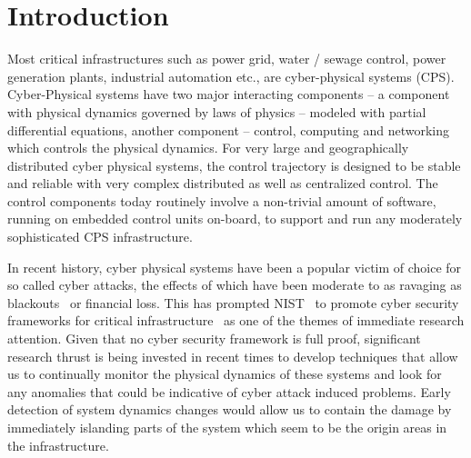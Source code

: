 \section{Introduction} \label{sec:intro}
\noindent
Most critical infrastructures such as power grid, water / sewage control, power generation plants, industrial automation etc., are cyber-physical systems (CPS). Cyber-Physical systems have two major interacting components -- a component with physical dynamics governed by laws of physics -- modeled with partial differential equations, another component -- control, computing and networking which controls the physical dynamics. For very large and geographically distributed cyber physical systems, the control trajectory is designed to be stable and reliable with very complex distributed as well as centralized control. The control components today 
routinely involve a non-trivial amount of software, running on embedded control units on-board, to support and run any moderately sophisticated CPS infrastructure.

In recent history, cyber physical systems have been a popular victim of choice for so called cyber attacks, the effects of which have been moderate to as ravaging as blackouts~\cite{blackout} or financial loss. This has prompted 
NIST~\cite{nist} to promote cyber security frameworks for critical infrastructure~\cite{cs-Framewrok} as 
one of the themes of immediate research attention. Given that no cyber security framework is full proof, significant research thrust is being invested in recent times to develop techniques that allow us to continually monitor the physical dynamics of these systems and look for any anomalies that could be indicative of cyber attack induced problems. Early detection of system dynamics changes would allow us to contain the damage by immediately islanding parts of the system which seem to be the origin areas in the infrastructure. 

